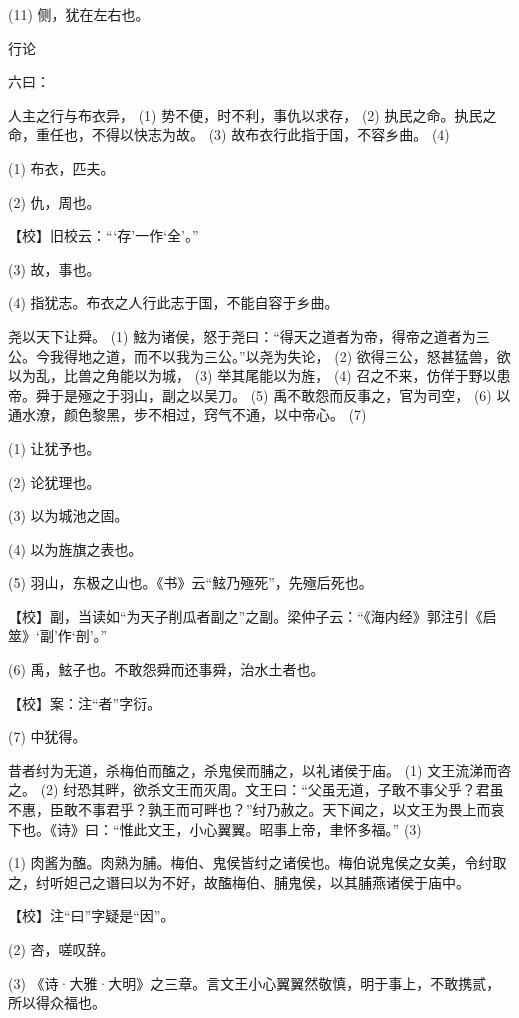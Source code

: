 \documentclass[12pt,UTF8]{ctexbook}
\begin{document}
(11) 侧，犹在左右也。





行论


六曰：

人主之行与布衣异， (1) 势不便，时不利，事仇以求存， (2) 执民之命。执民之命，重任也，不得以快志为故。 (3) 故布衣行此指于国，不容乡曲。 (4)

(1) 布衣，匹夫。

(2) 仇，周也。

【校】旧校云：“‘存’一作‘全’。”

(3) 故，事也。

(4) 指犹志。布衣之人行此志于国，不能自容于乡曲。

尧以天下让舜。 (1) 鮌为诸侯，怒于尧曰：“得天之道者为帝，得帝之道者为三公。今我得地之道，而不以我为三公。”以尧为失论， (2) 欲得三公，怒甚猛兽，欲以为乱，比兽之角能以为城， (3) 举其尾能以为旌， (4) 召之不来，仿佯于野以患帝。舜于是殛之于羽山，副之以吴刀。 (5) 禹不敢怨而反事之，官为司空， (6) 以通水潦，颜色黎黑，步不相过，窍气不通，以中帝心。 (7)

(1) 让犹予也。

(2) 论犹理也。

(3) 以为城池之固。

(4) 以为旌旗之表也。

(5) 羽山，东极之山也。《书》云“鮌乃殛死”，先殛后死也。

【校】副，当读如“为天子削瓜者副之”之副。梁仲子云：“《海内经》郭注引《启筮》‘副’作‘剖’。”

(6) 禹，鮌子也。不敢怨舜而还事舜，治水土者也。

【校】案：注“者”字衍。

(7) 中犹得。

昔者纣为无道，杀梅伯而醢之，杀鬼侯而脯之，以礼诸侯于庙。 (1) 文王流涕而咨之。 (2) 纣恐其畔，欲杀文王而灭周。文王曰：“父虽无道，子敢不事父乎？君虽不惠，臣敢不事君乎？孰王而可畔也？”纣乃赦之。天下闻之，以文王为畏上而哀下也。《诗》曰：“惟此文王，小心翼翼。昭事上帝，聿怀多福。” (3)

(1) 肉酱为醢。肉熟为脯。梅伯、鬼侯皆纣之诸侯也。梅伯说鬼侯之女美，令纣取之，纣听妲己之谮曰以为不好，故醢梅伯、脯鬼侯，以其脯燕诸侯于庙中。

【校】注“曰”字疑是“因”。

(2) 咨，嗟叹辞。

(3) 《诗·大雅·大明》之三章。言文王小心翼翼然敬慎，明于事上，不敢携贰，所以得众福也。
\end{document}
